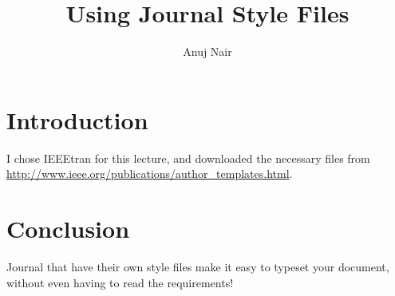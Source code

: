 \documentclass[conference]{IEEEtran}
\title{Using Journal Style Files}
\author{Anuj Nair}
\date{}
\begin{document}
\maketitle

\section{Introduction}
I chose IEEEtran for this lecture, and downloaded the necessary files from \url{http://www.ieee.org/publications/author_templates.html}.

\section{Conclusion}

  Journal that have their own style files make it easy to typeset your document, without even having to read the requirements!
\end{document}
